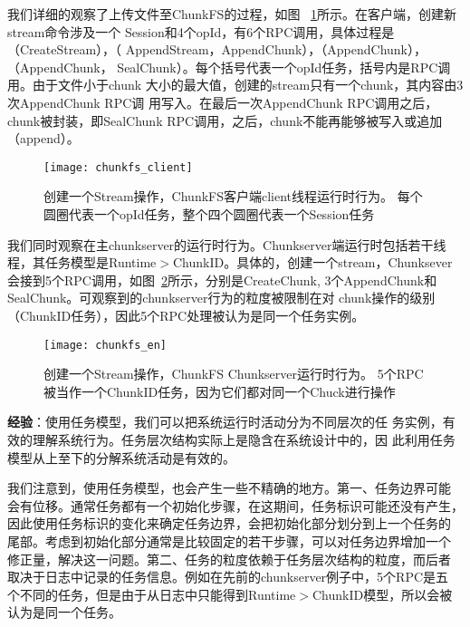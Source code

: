 我们详细的观察了上传文件至ChunkFS的过程，如图~
\ref{fig:chunkfs_client}所示。在客户端，创建新stream命令涉及一个
Session和4个opId，有6个RPC调用，具体过程是（Create\-Stream），（
Append\-Stream，Append\-Chunk），（Append\-Chunk），（Append\-Chunk，
Seal\-Chunk）。每个括号代表一个opId任务，括号内是RPC调用。由于文件小于chunk
大小的最大值，创建的stream只有一个chunk，其内容由3次Append\-Chunk RPC调
用写入。在最后一次Append\-Chunk RPC调用之后，chunk被封装，即Seal\-Chunk
RPC调用，之后，chunk不能再能够被写入或追加（append）。

\begin{figure}
  \centering
  \begin{minipage}{0.8\linewidth}
    \centering
    \texttt{[image: chunkfs\_client]}
    \caption{创建一个Stream操作，ChunkFS客户端client线程运行时行为。
    每个圆圈代表一个opId任务，整个四个圆圈代表一个Session任务}
    \label{fig:chunkfs_client}
  \end{minipage}
\end{figure}


我们同时观察在主chunkserver的运行时行为。Chunkserver端运行时包括若干线
程，其任务模型是Runtime$>$ChunkID。具体的，创建一个stream，Chunksever
会接到5个RPC调用，如图~\ref{fig:chunkserver}所示，分别是Create\-Chunk,
3个Append\-Chunk和Seal\-Chunk。可观察到的chunkserver行为的粒度被限制在对
chunk操作的级别（ChunkID任务），因此5个RPC处理被认为是同一个任务实例。

\begin{figure}
  \centering
  \begin{minipage}{0.8\linewidth}
    \centering
    \texttt{[image: chunkfs\_en]}
    \caption{创建一个Stream操作，ChunkFS Chunkserver运行时行为。
    5个RPC被当作一个ChunkID任务，因为它们都对同一个Chuck进行操作}
    \label{fig:chunkserver}
  \end{minipage}
\end{figure}



\textbf{经验}：使用任务模型，我们可以把系统运行时活动分为不同层次的任
务实例，有效的理解系统行为。任务层次结构实际上是隐含在系统设计中的，因
此利用任务模型从上至下的分解系统活动是有效的。

我们注意到，使用任务模型，也会产生一些不精确的地方。第一、任务边界可能
会有位移。通常任务都有一个初始化步骤，在这期间，任务标识可能还没有产生，
因此使用任务标识的变化来确定任务边界，会把初始化部分划分到上一个任务的
尾部。考虑到初始化部分通常是比较固定的若干步骤，可以对任务边界增加一个
修正量，解决这一问题。第二、任务的粒度依赖于任务层次结构的粒度，而后者
取决于日志中记录的任务信息。例如在先前的chunkserver例子中，5个RPC是五
个不同的任务，但是由于从日志中只能得到Runtime$>$ChunkID模型，所以会被
认为是同一个任务。

